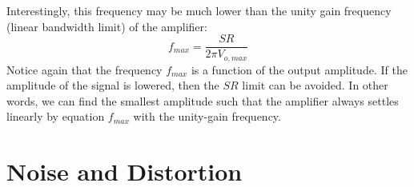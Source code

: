 Interestingly, this frequency may be much lower than the unity gain frequency (linear bandwidth limit) of the amplifier:
    \begin{equation} 
        f_{max} = \frac{SR}{2\pi V_{o,max}} 
    \end{equation}
Notice again that the frequency $f_{max}$ is a function of the output amplitude.  If the amplitude of the signal is lowered, then the $SR$ limit can be avoided.  In other words, we can find the smallest amplitude such that the amplifier always settles linearly by equation $f_{max}$ with the unity-gain frequency.
\section{Noise and Distortion}

